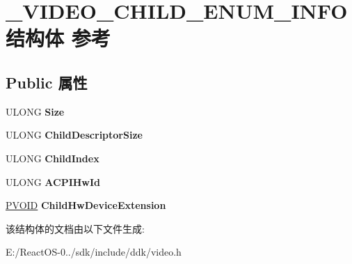 \hypertarget{struct___v_i_d_e_o___c_h_i_l_d___e_n_u_m___i_n_f_o}{}\section{\+\_\+\+V\+I\+D\+E\+O\+\_\+\+C\+H\+I\+L\+D\+\_\+\+E\+N\+U\+M\+\_\+\+I\+N\+F\+O结构体 参考}
\label{struct___v_i_d_e_o___c_h_i_l_d___e_n_u_m___i_n_f_o}
\subsection*{Public 属性}
\begin{DoxyCompactItemize}
\item 
\mbox{\label{struct___v_i_d_e_o___c_h_i_l_d___e_n_u_m___i_n_f_o_a0cff1ff2c9a5a3c95b9b3bae77133b0c}} 
U\+L\+O\+NG {\bfseries Size}
\item 
\mbox{\label{struct___v_i_d_e_o___c_h_i_l_d___e_n_u_m___i_n_f_o_a1901d45844054ae407e3522b1d50a410}} 
U\+L\+O\+NG {\bfseries Child\+Descriptor\+Size}
\item 
\mbox{\label{struct___v_i_d_e_o___c_h_i_l_d___e_n_u_m___i_n_f_o_addb804b09d97a93fcaa0b493a15cfbc3}} 
U\+L\+O\+NG {\bfseries Child\+Index}
\item 
\mbox{\label{struct___v_i_d_e_o___c_h_i_l_d___e_n_u_m___i_n_f_o_aaebb657b8fbc3790d6da7132e6cc79a5}} 
U\+L\+O\+NG {\bfseries A\+C\+P\+I\+Hw\+Id}
\item 
\mbox{\label{struct___v_i_d_e_o___c_h_i_l_d___e_n_u_m___i_n_f_o_ad6cc961401f344e61555a9af3feb0a08}} 
\hyperlink{interfacevoid}{P\+V\+O\+ID} {\bfseries Child\+Hw\+Device\+Extension}
\end{DoxyCompactItemize}


该结构体的文档由以下文件生成\+:\begin{DoxyCompactItemize}
\item 
E\+:/\+React\+O\+S-\/0../sdk/include/ddk/video.\+h\end{DoxyCompactItemize}
